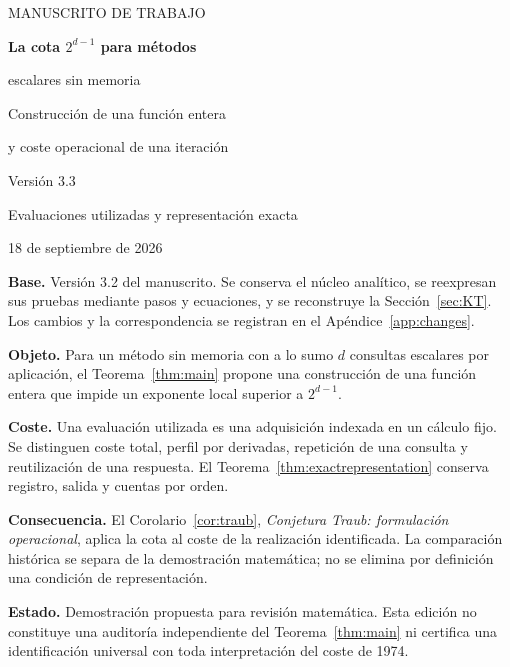 \documentclass[11pt,a4paper]{article}
\numberwithin{equation}{section}
\theoremstyle{definition}
\theoremstyle{remark}
\begin{document}
\begin{titlepage}
\centering
\vspace*{13mm}
{\large MANUSCRITO DE TRABAJO\par}
\vspace{13mm}
{\LARGE\bfseries La cota $2^{d-1}$ para métodos\par escalares sin memoria\par}
\vspace{9mm}
{\Large Construcción de una función entera\par y coste operacional de una iteración\par}
\vspace{10mm}
{\large Versión 3.3\par}
{\large Evaluaciones utilizadas y representación exacta\par}
\vspace{6mm}
{18 de septiembre de 2026\par}
\vfill
\begin{minipage}{0.91\textwidth}
\textbf{Base.} Versión 3.2 del manuscrito. Se conserva el núcleo analítico, se reexpresan sus pruebas mediante pasos y ecuaciones, y se reconstruye la Sección~\ref{sec:KT}. Los cambios y la correspondencia se registran en el Apéndice~\ref{app:changes}.

\textbf{Objeto.} Para un método sin memoria con a lo sumo $d$ consultas escalares por aplicación, el Teorema~\ref{thm:main} propone una construcción de una función entera que impide un exponente local superior a $2^{d-1}$.

\textbf{Coste.} Una evaluación utilizada es una adquisición indexada en un cálculo fijo. Se distinguen coste total, perfil por derivadas, repetición de una consulta y reutilización de una respuesta. El Teorema~\ref{thm:exactrepresentation} conserva registro, salida y cuentas por orden.

\textbf{Consecuencia.} El Corolario~\ref{cor:traub}, \emph{Conjetura Traub: formulación operacional}, aplica la cota al coste de la realización identificada. La comparación histórica se separa de la demostración matemática; no se elimina por definición una condición de representación.

\textbf{Estado.} Demostración propuesta para revisión matemática. Esta edición no constituye una auditoría independiente del Teorema~\ref{thm:main} ni certifica una identificación universal con toda interpretación del coste de 1974.
\end{minipage}
\vspace*{8mm}
\end{titlepage}
\tableofcontents
\clearpage
{}
\end{document}
